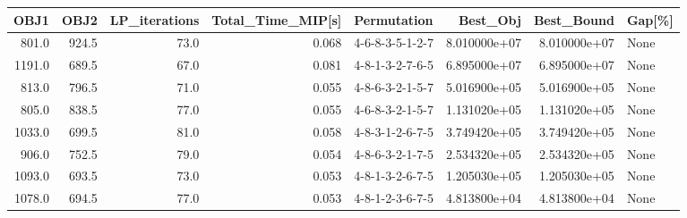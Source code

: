 \begin{tabular}{rrrrlrrl}
\toprule
   OBJ1 &   OBJ2 &  LP\_iterations &  Total\_Time\_MIP[s] &      Permutation &      Best\_Obj &    Best\_Bound & Gap[\%] \\
\midrule
  801.0 &  924.5 &           73.0 &              0.068 &  4-6-8-3-5-1-2-7 &  8.010000e+07 &  8.010000e+07 &   None \\
 1191.0 &  689.5 &           67.0 &              0.081 &  4-8-1-3-2-7-6-5 &  6.895000e+07 &  6.895000e+07 &   None \\
  813.0 &  796.5 &           71.0 &              0.055 &  4-8-6-3-2-1-5-7 &  5.016900e+05 &  5.016900e+05 &   None \\
  805.0 &  838.5 &           77.0 &              0.055 &  4-6-8-3-2-1-5-7 &  1.131020e+05 &  1.131020e+05 &   None \\
 1033.0 &  699.5 &           81.0 &              0.058 &  4-8-3-1-2-6-7-5 &  3.749420e+05 &  3.749420e+05 &   None \\
  906.0 &  752.5 &           79.0 &              0.054 &  4-8-6-3-2-1-7-5 &  2.534320e+05 &  2.534320e+05 &   None \\
 1093.0 &  693.5 &           73.0 &              0.053 &  4-8-1-3-2-6-7-5 &  1.205030e+05 &  1.205030e+05 &   None \\
 1078.0 &  694.5 &           77.0 &              0.053 &  4-8-1-2-3-6-7-5 &  4.813800e+04 &  4.813800e+04 &   None \\
\bottomrule
\end{tabular}

